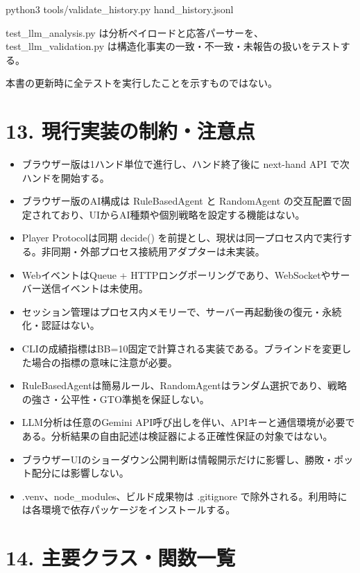 \documentclass[
]{article}
\begin{document}
python3 tools/validate\_history.py hand\_history.jsonl

test\_llm\_analysis.py は分析ペイロードと応答パーサーを、test\_llm\_validation.py
は構造化事実の一致・不一致・未報告の扱いをテストする。

本書の更新時に全テストを実行したことを示すものではない。

\section{13.
現行実装の制約・注意点}\label{ux73feux884cux5b9fux88c5ux306eux5236ux7d04ux6ce8ux610fux70b9}

\begin{itemize}
\item
  ブラウザー版は1ハンド単位で進行し、ハンド終了後に next-hand API
  で次ハンドを開始する。
\item
  ブラウザー版のAI構成は RuleBasedAgent と RandomAgent
  の交互配置で固定されており、UIからAI種類や個別戦略を設定する機能はない。
\item
  Player Protocolは同期 decide()
  を前提とし、現状は同一プロセス内で実行する。非同期・外部プロセス接続用アダプターは未実装。
\item
  WebイベントはQueue +
  HTTPロングポーリングであり、WebSocketやサーバー送信イベントは未使用。
\item
  セッション管理はプロセス内メモリーで、サーバー再起動後の復元・永続化・認証はない。
\item
  CLIの成績指標はBB=10固定で計算される実装である。ブラインドを変更した場合の指標の意味に注意が必要。
\item
  RuleBasedAgentは簡易ルール、RandomAgentはランダム選択であり、戦略の強さ・公平性・GTO準拠を保証しない。
\item
  LLM分析は任意のGemini API呼び出しを伴い、APIキーと通信環境が必要である。分析結果の自由記述は検証器による正確性保証の対象ではない。
\item
  ブラウザーUIのショーダウン公開判断は情報開示だけに影響し、勝敗・ポット配分には影響しない。
\item
  .venv、node\_modules、ビルド成果物は .gitignore
  で除外される。利用時には各環境で依存パッケージをインストールする。
\end{itemize}

\section{14.
主要クラス・関数一覧}\label{ux4e3bux8981ux30afux30e9ux30b9ux95a2ux6570ux4e00ux89a7}
\end{document}

